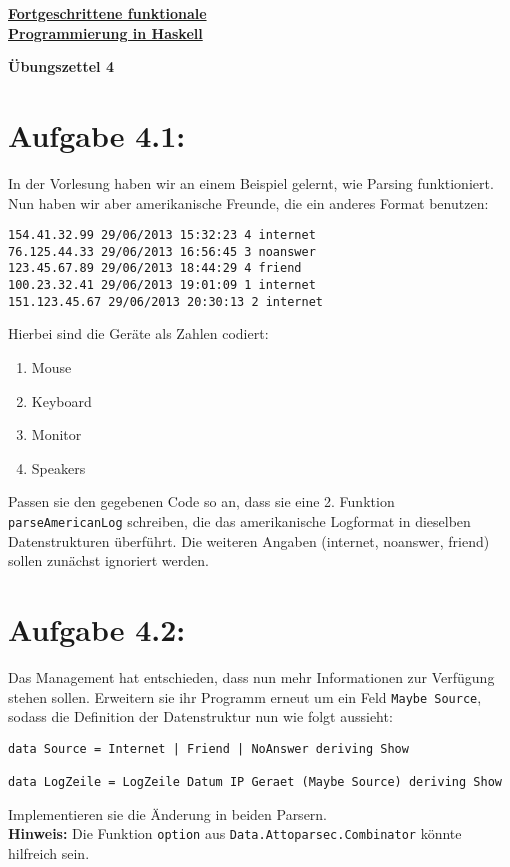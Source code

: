 \documentclass[a4paper,10pt]{scrartcl}
\newcommand{\underfat}[1]{\underline{\textbf{#1}}}
\newcommand{\theuebungszettel}{4}
\begin{document}
\begin{center}
  \begin{huge}
    \underfat{Fortgeschrittene funktionale}\\
    \underfat{Programmierung in Haskell}\\
  \end{huge}
\begin{LARGE}
\textbf{Übungszettel \theuebungszettel}
\end{LARGE}
\end{center}
\section*{Aufgabe \theuebungszettel.1:}
In der Vorlesung haben wir an einem Beispiel gelernt, wie Parsing funktioniert. Nun haben wir aber amerikanische Freunde, die ein anderes Format benutzen:
\begin{verbatim}
154.41.32.99 29/06/2013 15:32:23 4 internet
76.125.44.33 29/06/2013 16:56:45 3 noanswer
123.45.67.89 29/06/2013 18:44:29 4 friend
100.23.32.41 29/06/2013 19:01:09 1 internet
151.123.45.67 29/06/2013 20:30:13 2 internet
\end{verbatim}
Hierbei sind die Geräte als Zahlen codiert:
\begin{enumerate}
 \item Mouse
 \item Keyboard
 \item Monitor
 \item Speakers
\end{enumerate}
Passen sie den gegebenen Code so an, dass sie eine 2. Funktion \texttt{parseAmericanLog} schreiben, die das amerikanische Logformat in dieselben Datenstrukturen überführt. Die weiteren Angaben (internet, noanswer, friend) sollen zunächst ignoriert werden.
\section*{Aufgabe \theuebungszettel.2:}
Das Management hat entschieden, dass nun mehr Informationen zur Verfügung stehen sollen. Erweitern sie ihr Programm erneut um ein Feld \texttt{Maybe Source}, sodass die Definition der Datenstruktur nun wie folgt aussieht:
\begin{verbatim}
data Source = Internet | Friend | NoAnswer deriving Show

data LogZeile = LogZeile Datum IP Geraet (Maybe Source) deriving Show
\end{verbatim}
Implementieren sie die Änderung in beiden Parsern.\\
\textbf{Hinweis:} Die Funktion \texttt{option} aus \texttt{Data.Attoparsec.Combinator} könnte hilfreich sein.
\end{document}
